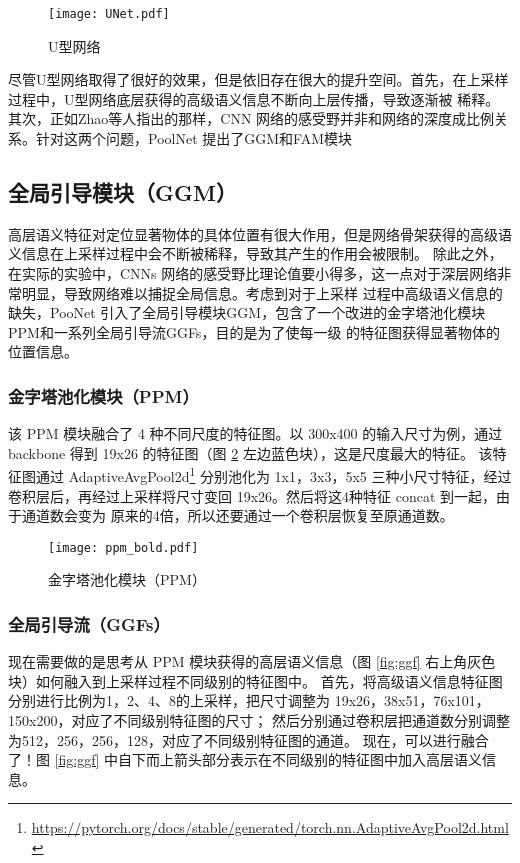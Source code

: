 \begin{figure}[h]
\centering
\texttt{[image: UNet.pdf]}
\caption{U型网络}
\label{fig:UNet}
\end{figure}

尽管U型网络取得了很好的效果，但是依旧存在很大的提升空间。首先，在上采样过程中，U型网络底层获得的高级语义信息不断向上层传播，导致逐渐被
稀释。其次，正如Zhao\cite{Zhao}等人指出的那样，CNN 网络的感受野并非和网络的深度成比例关系。针对这两个问题，PoolNet 提出了GGM和FAM模块

\subsection{全局引导模块（GGM）}

高层语义特征对定位显著物体的具体位置有很大作用，但是网络骨架获得的高级语义信息在上采样过程中会不断被稀释，导致其产生的作用会被限制。
除此之外，在实际的实验中\cite{Zhao}\cite{Zhou}，CNNs 网络的感受野比理论值要小得多，这一点对于深层网络非常明显，导致网络难以捕捉全局信息。考虑到对于上采样
过程中高级语义信息的缺失，PooNet 引入了全局引导模块GGM，包含了一个改进的金字塔池化模块PPM和一系列全局引导流GGFs，目的是为了使每一级
的特征图获得显著物体的位置信息。

\subsubsection{金字塔池化模块（PPM）}

该 PPM 模块融合了 4 种不同尺度的特征图。以 300x400 的输入尺寸为例，通过 backbone 得到 19x26 的特征图（图 \ref{fig:ppm} 左边蓝色块），这是尺度最大的特征。
该特征图通过 AdaptiveAvgPool2d\footnote{\url{https://pytorch.org/docs/stable/generated/torch.nn.AdaptiveAvgPool2d.html}}
分别池化为 1x1，3x3，5x5 三种小尺寸特征，经过卷积层后，再经过上采样将尺寸变回 19x26。然后将这4种特征 concat 到一起，由于通道数会变为
原来的4倍，所以还要通过一个卷积层恢复至原通道数。

\begin{figure}[h]
\centering
\texttt{[image: ppm\_bold.pdf]}
\caption{金字塔池化模块（PPM）}
\label{fig:ppm}
\end{figure}

\subsubsection{全局引导流（GGFs）}

现在需要做的是思考从 PPM 模块获得的高层语义信息（图 \ref{fig:ggf} 右上角灰色块）如何融入到上采样过程不同级别的特征图中。
首先，将高级语义信息特征图分别进行比例为1，2、4、8的上采样，把尺寸调整为 19x26，38x51，76x101，150x200，对应了不同级别特征图的尺寸；
然后分别通过卷积层把通道数分别调整为512，256，256，128，对应了不同级别特征图的通道。
现在，可以进行融合了！图 \ref{fig:ggf} 中自下而上箭头部分表示在不同级别的特征图中加入高层语义信息。


